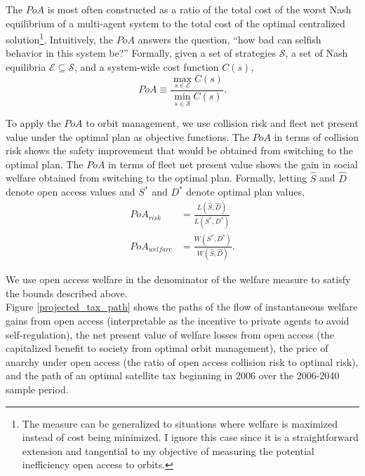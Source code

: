 \documentclass[12pt]{article}
\begin{document}
The $PoA$ is most often constructed as a ratio of the total cost of the worst Nash equilibrium of a multi-agent system to the total cost of the optimal centralized solution\footnote{The measure can be generalized to situations where welfare is maximized instead of cost being minimized. I ignore this case since it is a straightforward extension and tangential to my objective of measuring the potential inefficiency open access to orbits.}. Intuitively, the $PoA$ answers the question, ``how bad can selfish behavior in this system be?'' Formally, given a set of strategies $\mathcal{S}$, a set of Nash equilibria $\mathcal{E} \subseteq \mathcal{S}$, and a system-wide cost function $C(s)$,
\[ PoA \equiv \frac{\max_{s\in \mathcal{E}} C(s) }{ \min_{s \in \mathcal{S}} C(s)}. \]


To apply the $PoA$ to orbit management, we use collision risk and fleet net present value under the optimal plan as objective functions. The $PoA$ in terms of collision risk shows the safety improvement that would be obtained from switching to the optimal plan. The $PoA$ in terms of fleet net present value shows the gain in social welfare obtained from switching to the optimal plan. Formally, letting $\hat{S}$ and $\hat{D}$ denote open access values and $S^*$ and $D^*$ denote optimal plan values,
\begin{align}
PoA_{risk} &= \frac{L(\hat{S},\hat{D})}{L(S^*,D^*)} \\
PoA_{welfare} &= \frac{W(S^*,D^*)}{W(\hat{S},\hat{D})}.
\end{align}

We use open access welfare in the denominator of the welfare measure to satisfy the bounds described above. \\


Figure \ref{projected_tax_path} shows the paths of the flow of instantaneous welfare gains from open access (interpretable as the incentive to private agents to avoid self-regulation), the net present value of welfare losses from open access (the capitalized benefit to society from optimal orbit management), the price of anarchy under open access (the ratio of open access collision risk to optimal risk), and the path of an optimal satellite tax beginning in 2006 over the 2006-2040 sample period.
\end{document}
